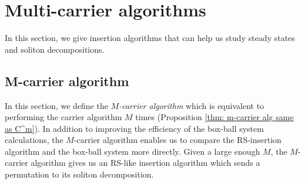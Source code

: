 \documentclass[submission]{FPSAC2021}
\theoremstyle{plain}
\theoremstyle{definition}
\numberwithin{equation}{section}
\begin{document}
\section{Multi-carrier  algorithms}

In this section, we give insertion algorithms that can help us study steady states and soliton decompositions.

\subsection{M-carrier algorithm}\label{sec: m-carrier}

 
In this section, we define the \emph{$M$-carrier algorithm} 
which is equivalent to performing the carrier algorithm $M$ times 
(Proposition \ref{thm: m-carrier alg same as C^m}).
In addition to improving the efficiency of the box-ball system calculations, 
the $M$-carrier algorithm 
enables us to compare the RS-insertion algorithm and the box-ball system more directly. 
Given a large enough $M$, the $M$-carrier algorithm gives us an RS-like insertion algorithm which sends a permutation to its soliton decomposition.
\end{document}
